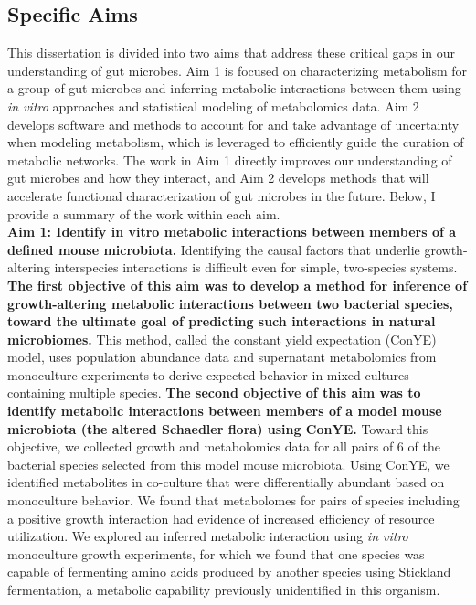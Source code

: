 \documentclass[11pt,twocolumn,notitlepage,openany,twoside]{book}
\begin{document}
\begin{refsection}
\section{Specific Aims}

This dissertation is divided into two aims that address these critical gaps in our understanding of gut microbes. Aim 1 is focused on characterizing metabolism for a group of gut microbes and inferring metabolic interactions between them using \textit{in vitro} approaches and statistical modeling of metabolomics data. Aim 2 develops software and methods to account for and take advantage of uncertainty when modeling metabolism, which is leveraged to efficiently guide the curation of metabolic networks. The work in Aim 1 directly improves our understanding of gut microbes and how they interact, and Aim 2 develops methods that will accelerate functional characterization of gut microbes in the future. Below, I provide a summary of the work within each aim.
\\[12pt]


\textbf{Aim 1: Identify in vitro metabolic interactions between members of a defined mouse microbiota.} Identifying the causal factors that underlie growth-altering interspecies interactions is difficult even for simple, two-species systems. \textbf{The first objective of this aim was to develop a method for inference of growth-altering metabolic interactions between two bacterial species, toward the ultimate goal of predicting such interactions in natural microbiomes.} This method, called the constant yield expectation (ConYE) model, uses population abundance data and supernatant metabolomics from monoculture experiments to derive expected behavior in mixed cultures containing multiple species. \textbf{The second objective of this aim was to identify metabolic interactions between members of a model mouse microbiota (the altered Schaedler flora) using ConYE.} Toward this objective, we collected growth and metabolomics data for all pairs of 6 of the bacterial species selected from this model mouse microbiota. Using ConYE, we identified metabolites in co-culture that were differentially abundant based on monoculture behavior. We found that metabolomes for pairs of species including a positive growth interaction had evidence of increased efficiency of resource utilization. We explored an inferred metabolic interaction using \textit{in vitro} monoculture growth experiments, for which we found that one species was capable of fermenting amino acids produced by another species using Stickland fermentation, a metabolic capability previously unidentified in this organism. \\[12pt]



\end{refsection}
\end{document}
